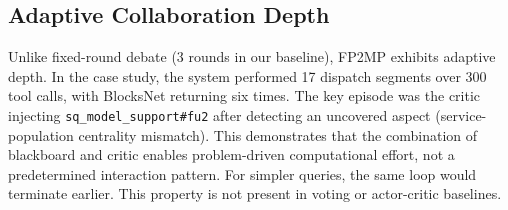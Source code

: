 \subsection{Adaptive Collaboration Depth}

Unlike fixed-round debate (3 rounds in our baseline), FP2MP exhibits adaptive depth.
In the case study, the system performed 17 dispatch segments over 300 tool calls, with BlocksNet returning six times.
The key episode was the critic injecting \texttt{sq\_model\_support\#fu2} after detecting an uncovered aspect (service-population centrality mismatch).
This demonstrates that the combination of blackboard and critic enables problem-driven computational effort, not a predetermined interaction pattern.
For simpler queries, the same loop would terminate earlier.
This property is not present in voting or actor-critic baselines.